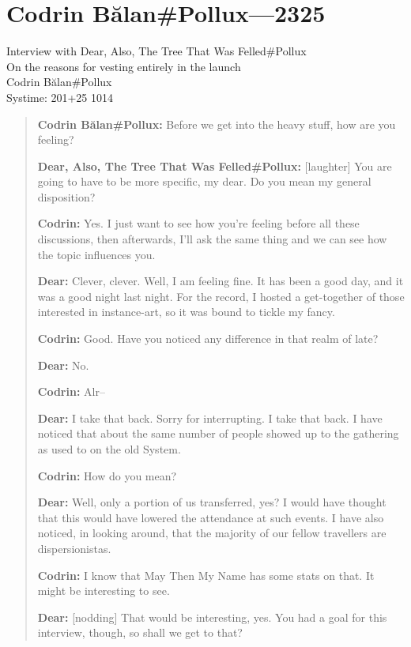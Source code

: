 \hypertarget{codrin-bux103lanpollux-2325}{%
\chapter{Codrin Bălan\#Pollux—2325}\label{codrin-bux103lanpollux-2325}}

Interview with Dear, Also, The Tree That Was Felled\#Pollux\\
On the reasons for vesting entirely in the launch\\
Codrin Bălan\#Pollux\\
Systime: 201+25 1014

\begin{quote}
\textbf{Codrin Bălan\#Pollux:} Before we get into the heavy stuff, how are you feeling?

\textbf{Dear, Also, The Tree That Was Felled\#Pollux:} {[}laughter{]} You are going to have to be more specific, my dear. Do you mean my general disposition?

\textbf{Codrin:} Yes. I just want to see how you're feeling before all these discussions, then afterwards, I'll ask the same thing and we can see how the topic influences you.

\textbf{Dear:} Clever, clever. Well, I am feeling fine. It has been a good day, and it was a good night last night. For the record, I hosted a get-together of those interested in instance-art, so it was bound to tickle my fancy.

\textbf{Codrin:} Good. Have you noticed any difference in that realm of late?

\textbf{Dear:} No.

\textbf{Codrin:} Alr--

\textbf{Dear:} I take that back. Sorry for interrupting. I take that back. I have noticed that about the same number of people showed up to the gathering as used to on the old System.

\textbf{Codrin:} How do you mean?

\textbf{Dear:} Well, only a portion of us transferred, yes? I would have thought that this would have lowered the attendance at such events. I have also noticed, in looking around, that the majority of our fellow travellers are dispersionistas.

\textbf{Codrin:} I know that May Then My Name has some stats on that. It might be interesting to see.

\textbf{Dear:} {[}nodding{]} That would be interesting, yes. You had a goal for this interview, though, so shall we get to that?


\end{quote}
